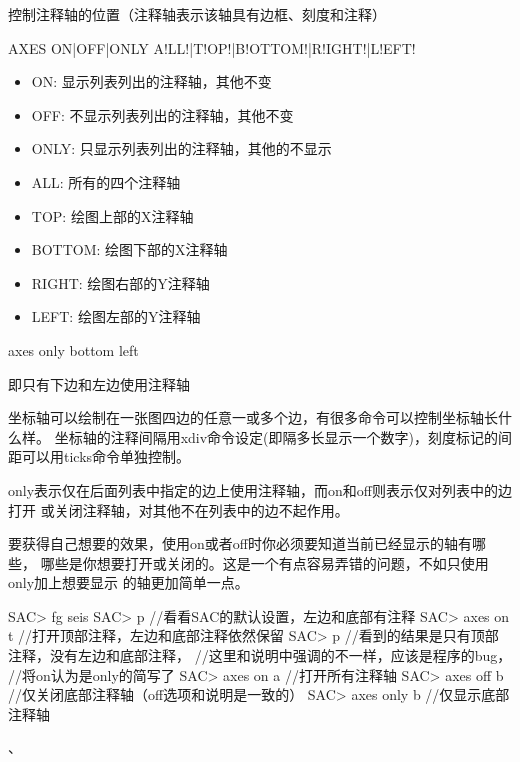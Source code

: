 \label{cmd:axes}

控制注释轴的位置（注释轴表示该轴具有边框、刻度和注释）

\begin{SACSTX}
AXES ON|OFF|ONLY A!LL!|T!OP!|B!OTTOM!|R!IGHT!|L!EFT!
\end{SACSTX}

\begin{itemize}
\item ON: 显示列表列出的注释轴，其他不变
\item OFF: 不显示列表列出的注释轴，其他不变
\item ONLY: 只显示列表列出的注释轴，其他的不显示
\item ALL: 所有的四个注释轴
\item TOP: 绘图上部的X注释轴
\item BOTTOM: 绘图下部的X注释轴
\item RIGHT: 绘图右部的Y注释轴
\item LEFT: 绘图左部的Y注释轴
\end{itemize}

\begin{SACDFT}
axes only bottom left
\end{SACDFT}
即只有下边和左边使用注释轴

坐标轴可以绘制在一张图四边的任意一或多个边，有很多命令可以控制坐标轴长什么样。
坐标轴的注释间隔用xdiv命令设定(即隔多长显示一个数字)，刻度标记的间距可以用ticks命令单独控制。

only表示仅在后面列表中指定的边上使用注释轴，而on和off则表示仅对列表中的边打开
或关闭注释轴，对其他不在列表中的边不起作用。

要获得自己想要的效果，使用on或者off时你必须要知道当前已经显示的轴有哪些，
哪些是你想要打开或关闭的。这是一个有点容易弄错的问题，不如只使用only加上想要显示
的轴更加简单一点。

\begin{SACCode}
SAC> fg seis
SAC> p           //看看SAC的默认设置，左边和底部有注释
SAC> axes on t   //打开顶部注释，左边和底部注释依然保留
SAC> p           //看到的结果是只有顶部注释，没有左边和底部注释，
                 //这里和说明中强调的不一样，应该是程序的bug，
                 //将on认为是only的简写了
SAC> axes on a   //打开所有注释轴
SAC> axes off b  //仅关闭底部注释轴（off选项和说明是一致的）
SAC> axes only b //仅显示底部注释轴
\end{SACCode}

、
